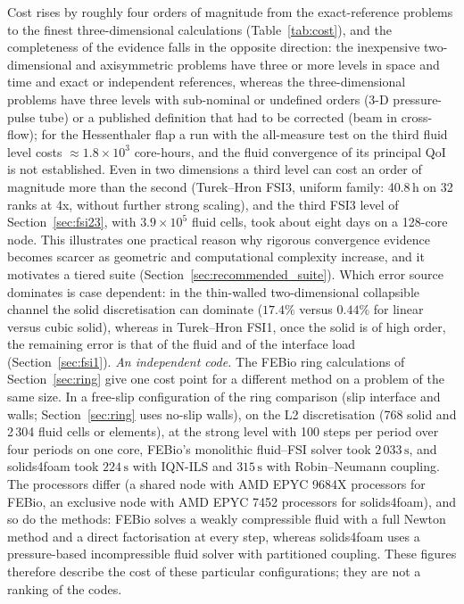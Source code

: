 Cost rises by roughly four orders of magnitude from the exact-reference problems to the finest three-dimensional calculations (Table~\ref{tab:cost}), and the completeness of the evidence falls in the opposite direction: the inexpensive two-dimensional and axisymmetric problems have three or more levels in space and time and exact or independent references, whereas the three-dimensional problems have three levels with sub-nominal or undefined orders (3-D pressure-pulse tube) or a published definition that had to be corrected (beam in cross-flow); for the Hessenthaler flap a run with the all-measure test on the third fluid level costs $\approx1.8\times10^{3}$ core-hours, and the fluid convergence of its principal QoI is not established. Even in two dimensions a third level can cost an order of magnitude more than the second (Turek--Hron FSI3, uniform family: 40.8\,h on 32 ranks at 4x, without further strong scaling), and the third FSI3 level of Section~\ref{sec:fsi23}, with $3.9\times10^{5}$ fluid cells, took about eight days on a 128-core node.
This illustrates one practical reason why rigorous convergence evidence becomes scarcer as geometric and computational complexity increase, and it motivates a tiered suite (Section~\ref{sec:recommended_suite}).
Which error source dominates is case dependent: in the thin-walled two-dimensional collapsible channel the solid discretisation can dominate ($17.4\%$ versus $0.44\%$ for linear versus cubic solid), whereas in Turek--Hron FSI1, once the solid is of high order, the remaining error is that of the fluid and of the interface load (Section~\ref{sec:fsi1}).
\emph{An independent code.}
The FEBio ring calculations of Section~\ref{sec:ring} give one cost point for a different method on a problem of the same size.
In a free-slip configuration of the ring comparison (slip interface and walls; Section~\ref{sec:ring} uses no-slip walls), on the L2 discretisation (768 solid and 2\,304 fluid cells or elements), at the strong level with 100 steps per period over four periods on one core, FEBio's monolithic fluid--FSI solver took $2\,033\,\mathrm{s}$, and solids4foam took $224\,\mathrm{s}$ with IQN-ILS and $315\,\mathrm{s}$ with Robin--Neumann coupling.
The processors differ (a shared node with AMD EPYC 9684X processors for FEBio, an exclusive node with AMD EPYC 7452 processors for solids4foam), and so do the methods: FEBio solves a weakly compressible fluid with a full Newton method and a direct factorisation at every step, whereas solids4foam uses a pressure-based incompressible fluid solver with partitioned coupling.
These figures therefore describe the cost of these particular configurations; they are not a ranking of the codes.
